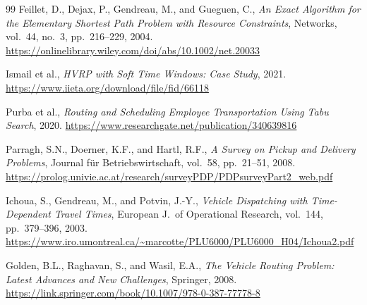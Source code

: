 \documentclass[11pt,a4paper]{article}
\begin{document}
\begin{thebibliography}{99}
Feillet, D., Dejax, P., Gendreau, M., and Gueguen, C.,
\textit{An Exact Algorithm for the Elementary Shortest Path Problem with Resource Constraints},
Networks, vol.~44, no.~3, pp.~216--229, 2004.
\url{https://onlinelibrary.wiley.com/doi/abs/10.1002/net.20033}

Ismail et al.,
\textit{HVRP with Soft Time Windows: Case Study},
2021.
\url{https://www.iieta.org/download/file/fid/66118}

Purba et al.,
\textit{Routing and Scheduling Employee Transportation Using Tabu Search},
2020.
\url{https://www.researchgate.net/publication/340639816}

Parragh, S.N., Doerner, K.F., and Hartl, R.F.,
\textit{A Survey on Pickup and Delivery Problems},
Journal f\"ur Betriebswirtschaft, vol.~58, pp.~21--51, 2008.
\url{https://prolog.univie.ac.at/research/surveyPDP/PDPsurveyPart2_web.pdf}

Ichoua, S., Gendreau, M., and Potvin, J.-Y.,
\textit{Vehicle Dispatching with Time-Dependent Travel Times},
European J.\ of Operational Research, vol.~144, pp.~379--396, 2003.
\url{https://www.iro.umontreal.ca/~marcotte/PLU6000/PLU6000_H04/Ichoua2.pdf}

Golden, B.L., Raghavan, S., and Wasil, E.A.,
\textit{The Vehicle Routing Problem: Latest Advances and New Challenges},
Springer, 2008.
\url{https://link.springer.com/book/10.1007/978-0-387-77778-8}

\end{thebibliography}
\end{document}
